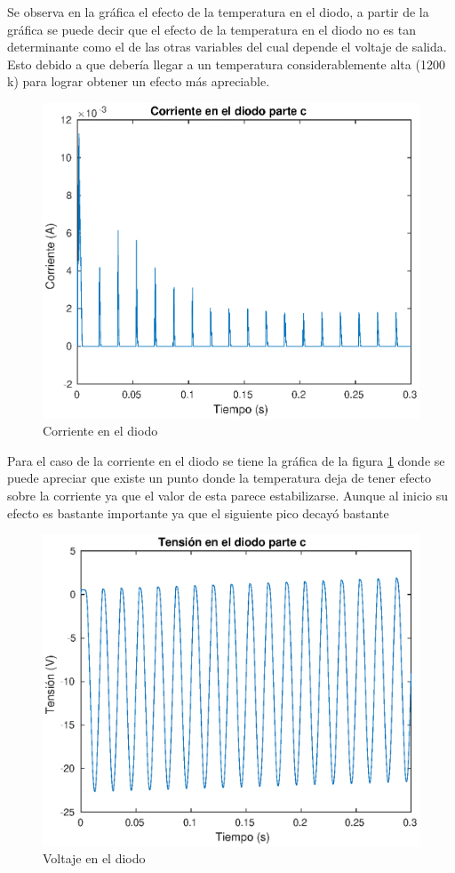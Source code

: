 \documentclass[12pt,letterpaper]{article}
\begin{document}
Se observa en la gráfica el efecto de la temperatura en el diodo, a partir de la gráfica se puede decir que el efecto de la temperatura en el diodo no es tan determinante como el de las otras variables del cual depende el voltaje de salida. Esto debido a que debería llegar a un temperatura considerablemente alta (1200 k) para lograr obtener un efecto más apreciable.

\begin{figure}[ht!]
  \centering
  \includegraphics[width=0.8\linewidth]{pictures/Ejercicio2_c_corriente_diodo.eps}
  \caption{Corriente en el diodo}
  \label{fig:2_c_Id}
\end{figure}

Para el caso de la corriente en el diodo se tiene la gráfica de la figura \ref{fig:2_c_Id} donde se puede apreciar que existe un punto donde la temperatura deja de tener efecto sobre la corriente ya que el valor de esta parece estabilizarse. Aunque al inicio su efecto es bastante importante ya que el siguiente pico decayó bastante

\begin{figure}[ht!]
  \centering
  \includegraphics[width=0.8\linewidth]{pictures/Ejercicio2_c_Vd.eps}
  \caption{Voltaje en el diodo}
  \label{fig:2_c_Vd}
\end{figure}
\end{document}

